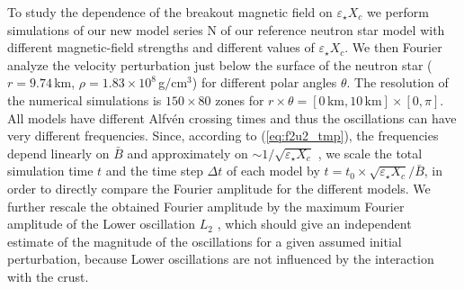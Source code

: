 \documentclass[useAMS,usenatbib]{mnras}
\begin{document}
To study the dependence of the breakout magnetic field on 
$\varepsilon_\star X_c$ we perform simulations of our new model 
series N of our reference neutron star model with different 
magnetic-field strengths and different values of $\varepsilon_\star X_c$.
We then Fourier analyze the velocity perturbation 
just below the surface of the neutron star ($r=9.74\,$km, 
$\rho=1.83\times10^8\,$g$/$cm$^3$) for different polar angles $\theta$.
The resolution of the numerical simulations is $150\times80$ zones for 
$r\times\theta=[0\,\text{km},10\,\text{km}]\times[0,\pi]$. All models have 
different Alfv\'en crossing times and thus the oscillations can have very 
different frequencies. Since, according to (\ref{eq:f2u2_tmp}), the 
frequencies depend linearly on $\bar B$ and approximately on 
$\sim 1/\sqrt{\varepsilon_\star X_c}$  \citep{Gabler2016}, we  scale the total  
simulation time 
$t$ and the time step $\Delta t$ of each model by $t=t_0 \times 
\sqrt{\varepsilon_\star X_c} / \bar B$, in order to directly 
compare the Fourier amplitude for the different models. We further rescale the obtained Fourier 
amplitude by the maximum Fourier amplitude of the Lower oscillation $L_2$ 
\cite[see][for a definition]{Gabler2016}, which should give an independent 
estimate of the magnitude of the oscillations for a given assumed initial 
perturbation, because Lower oscillations are 
not influenced by the interaction with the crust. 
\end{document}
